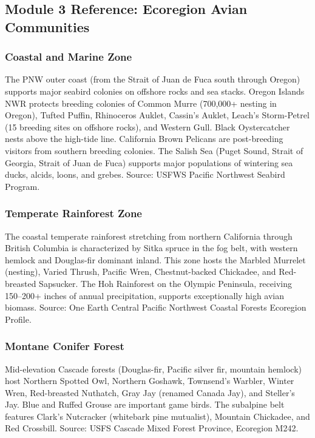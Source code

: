 \documentclass[11pt,letterpaper]{article}
\begin{document}
\subsection{Module 3 Reference: Ecoregion Avian Communities}

\subsubsection{Coastal and Marine Zone}
The PNW outer coast (from the Strait of Juan de Fuca south through Oregon) supports major seabird colonies on offshore rocks and sea stacks. Oregon Islands NWR protects breeding colonies of Common Murre (700,000+ nesting in Oregon), Tufted Puffin, Rhinoceros Auklet, Cassin's Auklet, Leach's Storm-Petrel (15 breeding sites on offshore rocks), and Western Gull. Black Oystercatcher nests above the high-tide line. California Brown Pelicans are post-breeding visitors from southern breeding colonies. The Salish Sea (Puget Sound, Strait of Georgia, Strait of Juan de Fuca) supports major populations of wintering sea ducks, alcids, loons, and grebes. Source: USFWS Pacific Northwest Seabird Program.

\subsubsection{Temperate Rainforest Zone}
The coastal temperate rainforest stretching from northern California through British Columbia is characterized by Sitka spruce in the fog belt, with western hemlock and Douglas-fir dominant inland. This zone hosts the Marbled Murrelet (nesting), Varied Thrush, Pacific Wren, Chestnut-backed Chickadee, and Red-breasted Sapsucker. The Hoh Rainforest on the Olympic Peninsula, receiving 150--200+ inches of annual precipitation, supports exceptionally high avian biomass. Source: One Earth Central Pacific Northwest Coastal Forests Ecoregion Profile.

\subsubsection{Montane Conifer Forest}
Mid-elevation Cascade forests (Douglas-fir, Pacific silver fir, mountain hemlock) host Northern Spotted Owl, Northern Goshawk, Townsend's Warbler, Winter Wren, Red-breasted Nuthatch, Gray Jay (renamed Canada Jay), and Steller's Jay. Blue and Ruffed Grouse are important game birds. The subalpine belt features Clark's Nutcracker (whitebark pine mutualist), Mountain Chickadee, and Red Crossbill. Source: USFS Cascade Mixed Forest Province, Ecoregion M242.
\end{document}
